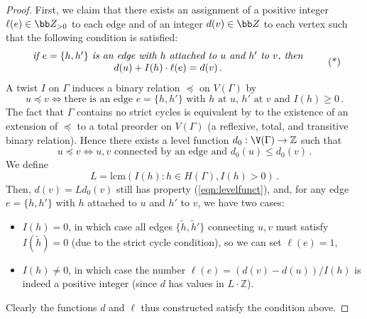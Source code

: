 \begin{proof}
First, we claim that there exists an assignment of a positive integer $\ell(e) \in \bb Z_{>0}$ to each edge and of an integer $d(v) \in \bb Z$ to each vertex such that the following condition is satisfied:
  \begin{equation}
    \begin{array}{c}
         \text{\emph{if $e = \{ h, h'\}$ is an edge with $h$ attached to $u$ and $h'$ to $v$, then}} \\
          d(u) + I(h)\cdot \ell(e)  = d(v)\, .
    \end{array}\tag{*}
  \end{equation}
A twist $I$ on $\Gamma$ induces a binary relation $\preceq$ on $V(\Gamma)$ by
\[u \preceq v \iff \text{there is an edge }e=\{h,h'\}\text{ with $h$ at $u$, $h'$ at $v$ and } I(h) \geq 0\, .\]
The fact that $\Gamma$ contains no strict cycles is equivalent by \cite{Suzumura1976Remarks-on-the} to the existence of an extension of $\preceq$ to a total preorder on $V(\Gamma)$ (a reflexive, total, and transitive binary relation). Hence there exists a level function $d_0 : \V(\Gamma) \to \mathbb{Z}$ such that
\begin{equation} \label{eqn:levelfunct} u \preceq v \iff u, v\text{ connected by an edge and }d_0(u) \leq d_0(v)\, .\end{equation}
We define
\[L = \mathrm{lcm}(I(h) : h \in H(\Gamma), I(h) > 0)\, .\]
Then, $d(v) = L d_0(v)$ still has property (\ref{eqn:levelfunct}), and,
for any edge $e = \{ h, h'\}$  with $h$ attached to $u$ and $h'$ to $v$, we have two cases:
\begin{itemize}
    \item $I(h) = 0$, in which case all edges $\{\tilde h, \tilde h'\}$ connecting $u,v$ must satisfy $I(\tilde h)=0$ (due to the strict cycle condition), so we can set $\ell(e)=1$,
    \item $I(h) \neq 0$, in which case the number $\ell(e) = (d(v) - d(u))/I(h)$ is indeed a positive integer (since $d$ has values in $L \cdot \mathbb{Z}$).
\end{itemize}
Clearly the functions $d$ and $\ell$ thus constructed satisfy the condition above.


\end{proof}
